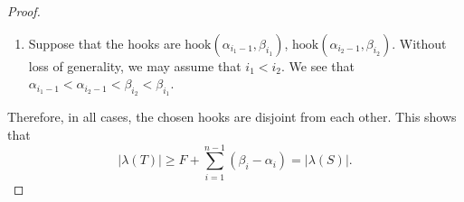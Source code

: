 \documentclass[10pt,a4paper]{amsart}
\newcommand{\hook}{\text{hook}}
\begin{document}
\begin{proof}
\begin{enumerate}
    We first consider the sub-case where $i_2<i_1$. Then we have $\alpha_{i_2-1}<\alpha_{i_1}<\beta_{i_1}<\beta_{i_2}$.

    Next, consider the sub-case where $i_2>i_1$. Since $i_2-i_1\neq 1$, this implies $i_2-1>i_1$. In this case, we have $\alpha_{i_1}<\alpha_{i_2-1}<\beta_{i_2}<\beta_{i_1}$.

    \item Suppose that the hooks are $\hook(\alpha_{i_1-1},\beta_{i_1})$, $\hook(\alpha_{i_2-1},\beta_{i_2})$.
    Without loss of generality, we may assume that $i_1<i_2$. We see that $\alpha_{i_1-1}<\alpha_{i_2-1}<\beta_{i_2}<\beta_{i_1}$.
\end{enumerate}
Therefore, in all cases, the chosen hooks are disjoint from each other.
This shows that 
\[|\lambda(T)|\geq F+\sum\limits_{i=1}^{n-1}(\beta_i-\alpha_i)=|\lambda(S)|.\]
\end{proof}
\end{document}
